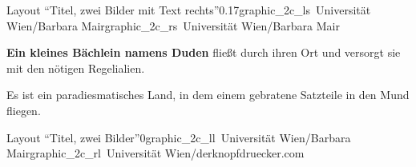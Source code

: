 \documentclass[hyperref={pdfpagelabels=false}, aspectratio=43, t]{beamer}  %
\begin{document}
\begin{graphicsFrame2}{Layout ``Titel, zwei Bilder mit Text rechts''}{0.17}{graphic_2c_ls}{\textcopyright~Universität Wien/Barbara Mair}{graphic_2c_rs}{\textcopyright~Universität Wien/Barbara Mair}

	\textbf{Ein kleines Bächlein namens Duden} fließt durch ihren Ort und versorgt sie mit den nötigen Regelialien.
	\smallskip

	Es ist ein paradiesmatisches Land, in dem einem gebratene Satzteile in den Mund fliegen.

\end{graphicsFrame2}

\begin{graphicsFrame2}{Layout ``Titel, zwei Bilder''}{0}{graphic_2c_ll}{\textcopyright~Universität Wien/Barbara Mair}{graphic_2c_rl}{\textcopyright~Universität Wien/derknopfdruecker.com}

\end{graphicsFrame2}

\fi

\end{document}
